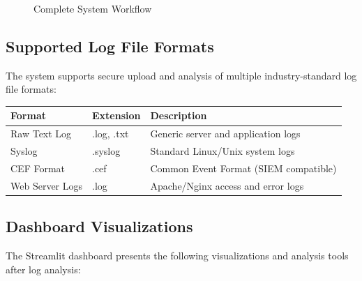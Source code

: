 \documentclass[12pt,a4paper]{article}
\begin{document}
\begin{figure}[H]
\caption{Complete System Workflow}
\label{fig:workflow}
\end{figure}

\subsection{Supported Log File Formats}

The system supports secure upload and analysis of multiple industry-standard log file formats:

\begin{table}[H]
\centering
\begin{tabular}{|l|l|l|}
\hline
\textbf{Format} & \textbf{Extension} & \textbf{Description} \\
\hline
Raw Text Log & .log, .txt & Generic server and application logs \\
\hline
Syslog & .syslog & Standard Linux/Unix system logs \\
\hline
CEF Format & .cef & Common Event Format (SIEM compatible) \\
\hline
Web Server Logs & .log & Apache/Nginx access and error logs \\
\hline
\end{tabular}
\label{tab:formats}
\end{table}

\subsection{Dashboard Visualizations}

The Streamlit dashboard presents the following visualizations and analysis tools after log analysis:
\end{document}
